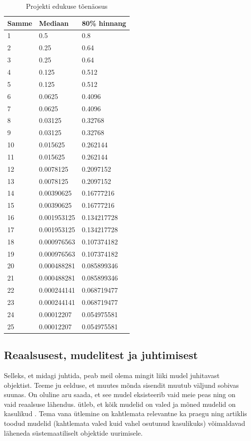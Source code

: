 \documentclass{article}
\begin{document}
\begin{table}
	\begin{center}
\begin{tabular}{lll}

\toprule
Samme & Mediaan & 80\% hinnang \\
\midrule
1 & 0.5 & 0.8 \\
2 & 0.25 & 0.64 \\
3 & 0.25 & 0.64 \\
4 & 0.125 & 0.512 \\
5 & 0.125 & 0.512 \\
6 & 0.0625 & 0.4096 \\
7 & 0.0625 & 0.4096 \\
8 & 0.03125 & 0.32768 \\
9 & 0.03125 & 0.32768 \\
10 & 0.015625 & 0.262144 \\
11 & 0.015625 & 0.262144 \\
12 & 0.0078125 & 0.2097152 \\
13 & 0.0078125 & 0.2097152 \\
14 & 0.00390625 & 0.16777216 \\
15 & 0.00390625 & 0.16777216 \\
16 & 0.001953125 & 0.134217728 \\
17 & 0.001953125 & 0.134217728 \\
18 & 0.000976563 & 0.107374182 \\
19 & 0.000976563 & 0.107374182 \\
20 & 0.000488281 & 0.085899346 \\
21 & 0.000488281 & 0.085899346 \\
22 & 0.000244141 & 0.068719477 \\
23 & 0.000244141 & 0.068719477 \\
24 & 0.00012207 & 0.054975581 \\
25 & 0.00012207 & 0.054975581 \\

\bottomrule
\end{tabular}
		\caption{Projekti edukuse tõenäosus}
		\label{tab:success}

	\end{center}
\end{table}

\subsection{Reaalsusest, mudelitest ja juhtimisest}
Selleks, et midagi juhtida, peab meil olema mingit liiki mudel juhitavast objektist. Teeme ju eelduse, et muutes mõnda sisendit muutub väljund sobivas suunas. On oluline aru saada, et see mudel eksisteerib vaid meie peas ning on vaid reaalsuse lähendus. \citeauthor{box1976science} ütleb, et kõik mudelid on valed ja mõned mudelid on kasulikud \citep{box1976science}. Tema vana ütlemine on kahtlemata relevantne ka praegu ning artiklis toodud mudelid (kahtlemata valed kuid vahel osutunud kasulikuks) võimaldavad läheneda süstemaatiliselt objektide uurimisele. 
\end{document}
